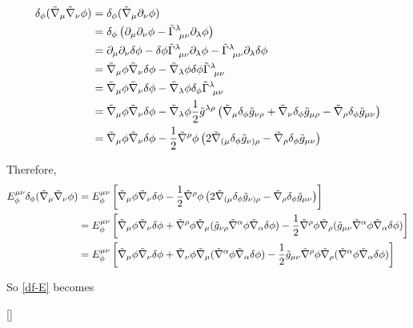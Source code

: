 \begin{align}
  \delta_\phi (\tilde{\nabla}_\mu\tilde{\nabla}_\nu\phi )&=\delta_\phi (\tilde{\nabla}_\mu\partial_\nu \phi )\\
  &=\delta_\phi \left(\partial_\mu \partial_\nu \phi -\tilde{\Gamma }^\lambda_{~\mu\nu }\partial_\lambda\phi \right)\\
  &=\partial_\mu\partial_\nu\delta \phi -\delta \phi\tilde{\Gamma }^\lambda_{~\mu\nu }\partial_\lambda\phi-\tilde{\Gamma }^\lambda_{~\mu\nu }\partial_\lambda\delta\phi \\
  &=\tilde{\nabla}_\mu\phi\tilde{\nabla}_\nu\delta \phi -\tilde{\nabla}_\lambda\phi\delta\phi \tilde{\Gamma }^\lambda_{~\mu\nu }\\
  &=\tilde{\nabla}_\mu\phi\tilde{\nabla}_\nu\delta \phi -\tilde{\nabla}_\lambda\phi \delta_\phi \tilde{\Gamma }^\lambda_{~\mu\nu }\\
  &=\tilde{\nabla}_\mu\phi\tilde{\nabla}_\nu\delta \phi-\tilde{\nabla}_\lambda\phi\frac{1}{2}\tilde{g}^{\lambda\rho }\left(\tilde{\nabla}_\mu\delta_\phi \tilde{g}_{\nu\rho }+\tilde{\nabla}_\nu \delta_\phi \tilde{g}_{\mu\rho }-\tilde{\nabla}_\rho \delta_\phi \tilde{g}_{\mu\nu }\right)\\
  &=\tilde{\nabla}_\mu\phi\tilde{\nabla}_\nu\delta \phi-\frac{1}{2}\tilde{\nabla}^\rho\phi \left(2\tilde{\nabla}_{(\mu }\delta_\phi \tilde{g}_{\nu)\rho }-\tilde{\nabla}_\rho \delta_\phi \tilde{g}_{\mu\nu }\right)
\end{align}


Therefore,
\begin{align}
  E^{\mu\nu }_\phi \delta_\phi (\tilde{\nabla}_\mu\tilde{\nabla}_\nu\phi )&=E^{\mu\nu }_\phi \left[\tilde{\nabla}_\mu\phi\tilde{\nabla}_\nu\delta \phi-\frac{1}{2}\tilde{\nabla}^\rho\phi \left(2\tilde{\nabla}_{(\mu }\delta_\phi \tilde{g}_{\nu)\rho }-\tilde{\nabla}_\rho \delta_\phi \tilde{g}_{\mu\nu }\right)\right]\\
  &=E^{\mu\nu }_\phi \left[\tilde{\nabla}_\mu\phi\tilde{\nabla}_\nu\delta \phi+\tilde{\nabla}^\rho\phi\tilde{\nabla}_\mu(\tilde{g}_{\nu\rho }\tilde{\nabla}^\alpha\phi\tilde{\nabla}_\alpha\delta\phi )-\frac{1}{2}\tilde{\nabla}^\rho\phi\tilde{\nabla}_\rho (\tilde{g}_{\mu\nu }\tilde{\nabla}^\alpha\phi\tilde{\nabla}_\alpha\delta\phi )\right]\\
  &=E^{\mu\nu }_\phi \left[\tilde{\nabla}_\mu\phi\tilde{\nabla}_\nu\delta\phi +\tilde{\nabla}_\nu\phi \tilde{\nabla}_\mu(\tilde{\nabla}^\alpha\phi\tilde{\nabla}_\alpha\delta\phi )-\frac{1}{2}\tilde{g}_{\mu\nu }\tilde{\nabla}^\rho\phi\tilde{\nabla}_\rho(\tilde{\nabla}^\alpha\phi\tilde{\nabla}_\alpha\delta\phi )\right]
\end{align}

So \eqref{df-E} becomes

[]

